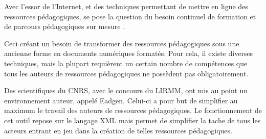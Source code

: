 Avec l'essor de l'Internet, et des techniques permettant de mettre
en ligne des ressources pédagogiques, se pose la question du besoin
continuel de formation et de parcours pédagogiques \og sur mesure \fg.

Ceci créant un besoin de transformer des ressources pédagogiques sous
une ancienne forme en documents numériques formatés. Pour cela, il
existe diverses techniques, mais la plupart requièrent un certain
nombre de compétences que tous les auteurs de ressources
pédagogiques ne possèdent pas obligatoirement. 

Des scientifiques du CNRS, avec le concours du LIRMM, ont mis
au point un environnement auteur, appelé Eadgen. Celui-ci a pour but
de simplifier au maximum le travail des auteurs de ressources pédagogiques.
Le fonctionnement de cet outil repose sur le langage XML mais permet
de simplifier la tache de tous les acteurs entrant en jeu dans la 
création de telles ressources pédagogiques.